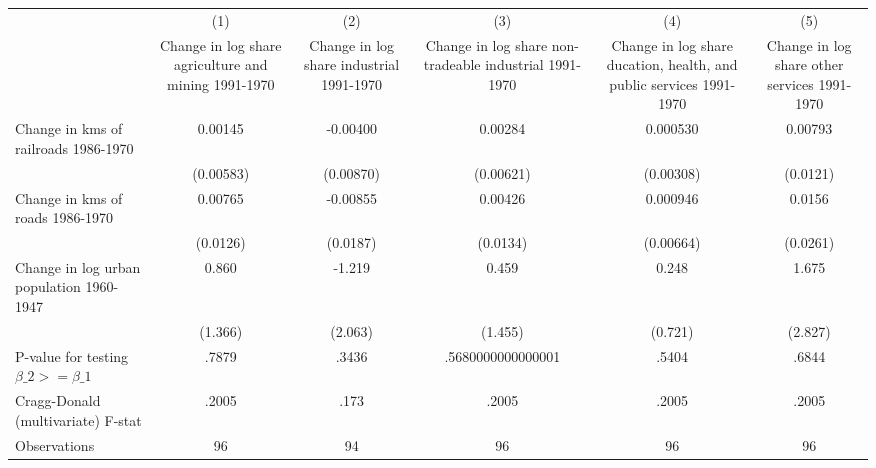 {
\def\sym#1{\ifmmode^{#1}\else\(^{#1}\)\fi}
\begin{tabular}{l*{5}{c}}
\hline\hline
                &\multicolumn{1}{c}{(1)}&\multicolumn{1}{c}{(2)}&\multicolumn{1}{c}{(3)}&\multicolumn{1}{c}{(4)}&\multicolumn{1}{c}{(5)}\\
                &\multicolumn{1}{c}{Change in log share agriculture and mining 1991-1970}&\multicolumn{1}{c}{Change in log share industrial 1991-1970}&\multicolumn{1}{c}{Change in log share non-tradeable industrial 1991-1970}&\multicolumn{1}{c}{Change in log share ducation, health, and public services 1991-1970}&\multicolumn{1}{c}{Change in log share other services 1991-1970}\\
\hline
Change in kms of railroads 1986-1970&  0.00145         & -0.00400         &  0.00284         & 0.000530         &  0.00793         \\
                &(0.00583)         &(0.00870)         &(0.00621)         &(0.00308)         & (0.0121)         \\
[1em]
Change in kms of roads 1986-1970&  0.00765         & -0.00855         &  0.00426         & 0.000946         &   0.0156         \\
                & (0.0126)         & (0.0187)         & (0.0134)         &(0.00664)         & (0.0261)         \\
[1em]
Change in log urban population 1960-1947&    0.860         &   -1.219         &    0.459         &    0.248         &    1.675         \\
                &  (1.366)         &  (2.063)         &  (1.455)         &  (0.721)         &  (2.827)         \\
\hline
P-value for testing $\beta\_{2} >= \beta\_{1}$&    .7879         &    .3436         &.5680000000000001         &    .5404         &    .6844         \\
Cragg-Donald (multivariate) F-stat&    .2005         &     .173         &    .2005         &    .2005         &    .2005         \\
Observations    &       96         &       94         &       96         &       96         &       96         \\
\hline\hline
\end{tabular}
}
